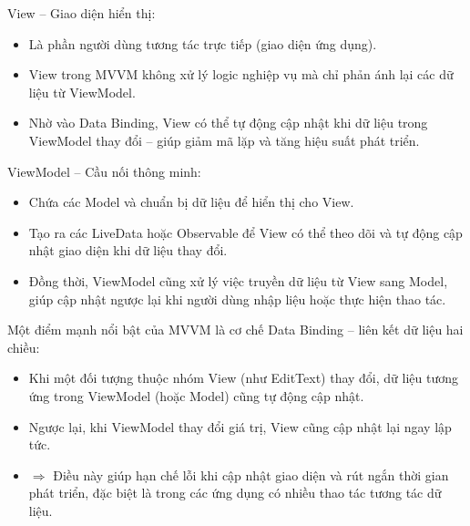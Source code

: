    \begin{flushleft}
      \hspace*{0.8cm}View – Giao diện hiển thị:
      \setlength{\leftmargini}{1.5cm}
      \begin{itemize}
          \item Là phần người dùng tương tác trực tiếp (giao diện ứng dụng).
          \item View trong MVVM không xử lý logic nghiệp vụ mà chỉ phản ánh lại các dữ liệu từ ViewModel.
          \item Nhờ vào Data Binding, View có thể tự động cập nhật khi dữ liệu trong ViewModel thay đổi – giúp giảm mã lặp và tăng hiệu suất phát triển.
      \end{itemize}
    \end{flushleft}

    \begin{flushleft}
      \hspace*{0.8cm}ViewModel – Cầu nối thông minh:
      \setlength{\leftmargini}{1.5cm}
      \begin{itemize}
          \item Chứa các Model và chuẩn bị dữ liệu để hiển thị cho View.
          \item Tạo ra các LiveData hoặc Observable để View có thể theo dõi và tự động cập nhật giao diện khi dữ liệu thay đổi.
          \item Đồng thời, ViewModel cũng xử lý việc truyền dữ liệu từ View sang Model, giúp cập nhật ngược lại khi người dùng nhập liệu hoặc thực hiện thao tác.
      \end{itemize}
    \end{flushleft}

    \begin{flushleft}
      \hspace*{0.8cm}Một điểm mạnh nổi bật của MVVM là cơ chế Data Binding – liên kết dữ liệu hai chiều:
      \setlength{\leftmargini}{1.5cm}
      \begin{itemize}
          \item Khi một đối tượng thuộc nhóm View (như EditText) thay đổi, dữ liệu tương ứng trong ViewModel (hoặc Model) cũng tự động cập nhật.
          \item Ngược lại, khi ViewModel thay đổi giá trị, View cũng cập nhật lại ngay lập tức.
          \item[]$\Rightarrow$ Điều này giúp hạn chế lỗi khi cập nhật giao diện và rút ngắn thời gian phát triển, đặc biệt là trong các ứng dụng có nhiều thao tác tương tác dữ liệu.
      \end{itemize}
    \end{flushleft}

